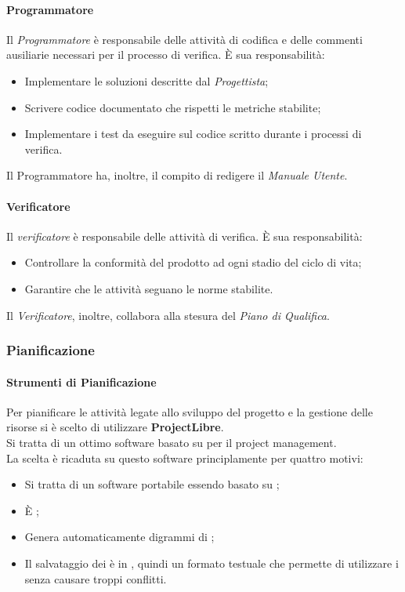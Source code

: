         \paragraph{Programmatore}
          Il \emph{Programmatore} è responsabile delle attività di codifica e delle commenti ausiliarie necessari per il processo di verifica.
          È sua responsabilità:
          \begin{itemize}
            \item Implementare le soluzioni descritte dal \emph{Progettista};
            \item Scrivere codice documentato che rispetti le metriche stabilite;
            \item Implementare i test da eseguire sul codice scritto durante i processi di verifica.
          \end{itemize}
          Il Programmatore ha, inoltre, il compito di redigere il \emph{Manuale Utente}.
        \paragraph{Verificatore}
          Il \emph{verificatore} è responsabile delle attività di verifica.
          È sua responsabilità:
          \begin{itemize}
            \item Controllare la conformità del prodotto ad ogni stadio del ciclo di vita;
            \item Garantire  che le attività seguano le norme stabilite.
          \end{itemize}
          Il \emph{Verificatore}, inoltre, collabora alla stesura del \emph{Piano di Qualifica}.
    \subsubsection{Pianificazione}
      \paragraph{Strumenti di Pianificazione}
        Per pianificare le attività legate allo sviluppo del progetto e la gestione delle risorse si è scelto di utilizzare \textbf{ProjectLibre}.\\
        Si tratta di un ottimo software  basato su  per il project management.\\
        La scelta è ricaduta su questo software principlamente per quattro motivi:
        \begin{itemize}
          \item Si tratta di un software portabile essendo basato su ;
          \item È ;
          \item Genera automaticamente digrammi di ;
          \item Il salvataggio dei  è in , quindi un formato testuale che permette di utilizzare i  senza causare troppi conflitti.
        \end{itemize}

